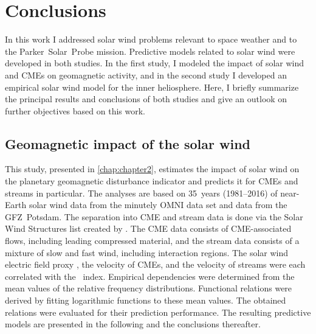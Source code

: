 
\chapter{Conclusions}
\label{chap:summary}

In this work I addressed solar wind problems relevant to space weather and to the Parker~Solar~Probe mission. Predictive models related to solar wind were developed in both studies. In the first study, I modeled the impact of solar wind and CMEs on geomagnetic activity, and in the second study I developed an empirical solar wind model for the inner heliosphere.
Here, I briefly summarize the principal results and conclusions of both studies and give an outlook on further objectives based on this work.

\section{Geomagnetic impact of the solar wind}
This study, presented in \autoref{chap:chapter2}, estimates the impact of solar wind on the planetary geomagnetic disturbance indicator \Kp{} and predicts it for CMEs and streams in particular.
The analyses are based on 35~years (1981--2016) of near-Earth solar wind data from the minutely OMNI data set and \Kp{} data from the GFZ~Potsdam. The separation into CME and stream data is done via the Solar Wind Structures list created by \citet{Richardson2000}. The CME data consists of CME-associated flows, including leading compressed material, and the stream data consists of a mixture of slow and fast wind, including interaction regions. The solar wind electric field proxy \vBz{}, the velocity of CMEs, and the velocity of streams were each correlated with the \Kp~index. Empirical dependencies were determined from the mean values of the relative \Kp{} frequency distributions. Functional relations were derived by fitting logarithmic functions to these mean \Kp{} values.
The obtained \Kp{} relations were evaluated for their prediction performance. The resulting predictive models are presented in the following and the conclusions thereafter.

\medskip

